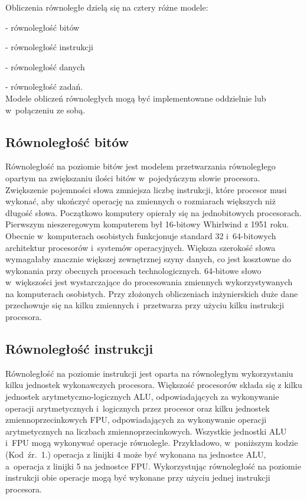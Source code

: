 Obliczenia równoległe dzielą się na cztery różne modele:

- równoległość bitów

- równoległość instrukcji

- równoległość danych

- równoległość zadań.\\

Modele obliczeń równoległych mogą być implementowane oddzielnie lub w~połączeniu ze sobą.

\subsection{Równoległość bitów}\label{sec:bitp}

Równoległość na poziomie bitów jest modelem przetwarzania równoległego opartym na zwiększaniu ilości bitów w~pojedyńczym słowie procesora. Zwiększenie pojemności słowa zmniejsza liczbę instrukcji, które procesor musi wykonać, aby ukończyć operację na zmiennych o rozmiarach większych niż długość słowa.
Początkowo komputery opierały się na jednobitowych procesorach. Pierwszym nieszeregowym komputerem był 16-bitowy Whirlwind z 1951 roku. Obecnie w~komputerach osobistych funkcjonuje standard 32 i~64-bitowych architektur procesorów i~systemów operacyjnych. Większa szerokość słowa wymagałaby znacznie większej zewnętrznej szyny danych, co jest kosztowne do wykonania przy obecnych procesach technologicznych. 64-bitowe słowo w~większości jest wystarczające do  procesowania zmiennych wykorzystywanych na komputerach osobistych. Przy złożonych obliczeniach inżynierskich duże dane przechowuje się na kilku zmiennych i~przetwarza przy użyciu kilku instrukcji procesora.

\subsection{Równoległość instrukcji}\label{sec:instp}

Równoległość na poziomie instrukcji jest oparta na równoległym wykorzystaniu kilku jednostek wykonawczych procesora. Większość procesorów składa się z kilku jednostek arytmetyczno-logicznych ALU, odpowiadających za wykonywanie operacji arytmetycznych i~logicznych przez procesor oraz kilku jednostek zmiennoprzecinkowych FPU, odpowiadających za wykonywanie operacji arytmetycznych na liczbach zmiennoprzecinkowych. Wszystkie jednostki ALU i~FPU mogą wykonywać operacje równolegle. Przykładowo, w~poniższym kodzie (Kod~źr.~1.) operacja z linijki 4 może być wykonana na jednostce ALU, a~operacja z linijki 5 na jednostce FPU. Wykorzystując równoległość na poziomie instrukcji obie operacje mogą być wykonane przy użyciu jednej instrukcji procesora.

